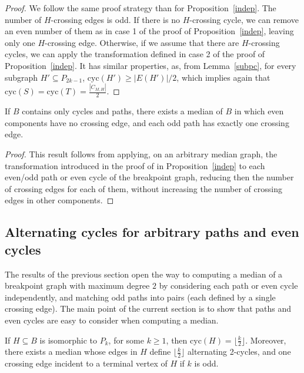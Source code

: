 \documentclass[10pt]{llncs}
\begin{document}
\begin{proof}
  We follow the same proof strategy than for
  Proposition~\ref{indep}. The number of $H$-crossing edges is odd. If
  there is no $H$-crossing cycle, we can remove an even number of them
  as in case 1 of the proof of Proposition~\ref{indep}, leaving only
  one $H$-crossing edge. Otherwise, if we assume that there are
  $H$-crossing cycles, we can apply the transformation defined in case
  2 of the proof of Proposition~\ref{indep}. It has similar
  properties, as, from Lemma~\ref{subpc}, for every subgraph $H'
  \subseteq P_{2k-1}$, $\text{cyc}(H') \geq |E(H')|/2$, which implies
  again that $\text{cyc}(S) = \text{cyc}(T) = \frac{|C_{M,H}|}{2}$.
\end{proof}



\begin{proposition}\label{themedian}
  If $B$ contains only cycles and paths, there exists a median of $B$
  in which even components have no crossing edge, and each odd path
  has exactly one crossing edge.
\end{proposition}

\begin{proof}
  This result follows from applying, on an arbitrary median graph, the
  transformation introduced in the proof of in Proposition~\ref{indep}
  to each even/odd path or even cycle of the breakpoint graph,
  reducing then the number of crossing edges for each of them, without
  increasing the number of crossing edges in other components.  \end{proof}


\subsection{Alternating cycles for arbitrary paths and even cycles}

The results of the previous section open the way to computing a median
of a breakpoint graph with maximum degree $2$ by considering each path
or even cycle independently, and matching odd paths into pairs (each
defined by a single crossing edge).  The main point of the current
section is to show that paths and even cycles are easy to consider
when computing a median.

\begin{proposition} \label{cycP}
  If $H\subseteq B$ is isomorphic to $P_k$, for some $k\geq 1$, then
  $\text{cyc}(H) = \lfloor \frac{k}{2}\rfloor$. Moreover, there exists
  a median whose edges in $H$ define $\lfloor \frac{k}{2}\rfloor$
  alternating 2-cycles, and one crossing edge incident to a terminal
  vertex of $H$ if $k$ is odd.
\end{proposition}
\end{document}
